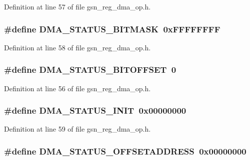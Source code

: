 Definition at line 57 of file gsn\_\-reg\_\-dma\_\-op.h.

\hypertarget{a00547_abbb907be2c04d2a418451bd7e67d1d31}{
\subsubsection[{DMA\_\-STATUS\_\-BITMASK}]{\setlength{\rightskip}{0pt plus 5cm}\#define DMA\_\-STATUS\_\-BITMASK~0xFFFFFFFF}}
\label{a00547_abbb907be2c04d2a418451bd7e67d1d31}


Definition at line 58 of file gsn\_\-reg\_\-dma\_\-op.h.

\hypertarget{a00547_a0883a182ca745da40ee167a33546ddf2}{
\subsubsection[{DMA\_\-STATUS\_\-BITOFFSET}]{\setlength{\rightskip}{0pt plus 5cm}\#define DMA\_\-STATUS\_\-BITOFFSET~0}}
\label{a00547_a0883a182ca745da40ee167a33546ddf2}


Definition at line 56 of file gsn\_\-reg\_\-dma\_\-op.h.

\hypertarget{a00547_a07b3d23f33e476a2b250a6c5fdb63aab}{
\subsubsection[{DMA\_\-STATUS\_\-INIT}]{\setlength{\rightskip}{0pt plus 5cm}\#define DMA\_\-STATUS\_\-INIT~0x00000000}}
\label{a00547_a07b3d23f33e476a2b250a6c5fdb63aab}


Definition at line 59 of file gsn\_\-reg\_\-dma\_\-op.h.

\hypertarget{a00547_a7468fcbcee275ca417ae33054686e3f5}{
\subsubsection[{DMA\_\-STATUS\_\-OFFSETADDRESS}]{\setlength{\rightskip}{0pt plus 5cm}\#define DMA\_\-STATUS\_\-OFFSETADDRESS~0x00000000}}
\label{a00547_a7468fcbcee275ca417ae33054686e3f5}


